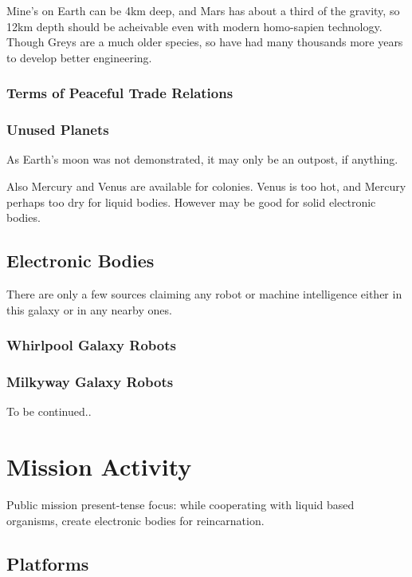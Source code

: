 \documentclass{report}
\begin{document}
Mine's on Earth can be 4km deep, and Mars has about a third of the gravity, so
12km depth should be acheivable even with modern homo-sapien technology. Though
Greys are a much older species, so have had many thousands more years to develop
better engineering.

\subsection{Terms of Peaceful Trade Relations}


\subsection{Unused Planets}

As Earth's moon was not demonstrated, it may only be an outpost, if anything.

Also Mercury and Venus are available for colonies. Venus is too hot, and Mercury
perhaps too dry for liquid bodies. However may be good for solid electronic
bodies. 



\section{Electronic Bodies}

There are only a few sources claiming any robot or machine intelligence either
in this galaxy or in any nearby ones.

\subsection{Whirlpool Galaxy Robots}

\subsection{Milkyway Galaxy Robots}


To be continued..

%
\chapter{Mission Activity}
\label{present}
Public mission present-tense focus: while cooperating with liquid based organisms,
create electronic bodies for reincarnation.

\section{Platforms}
\end{document}
